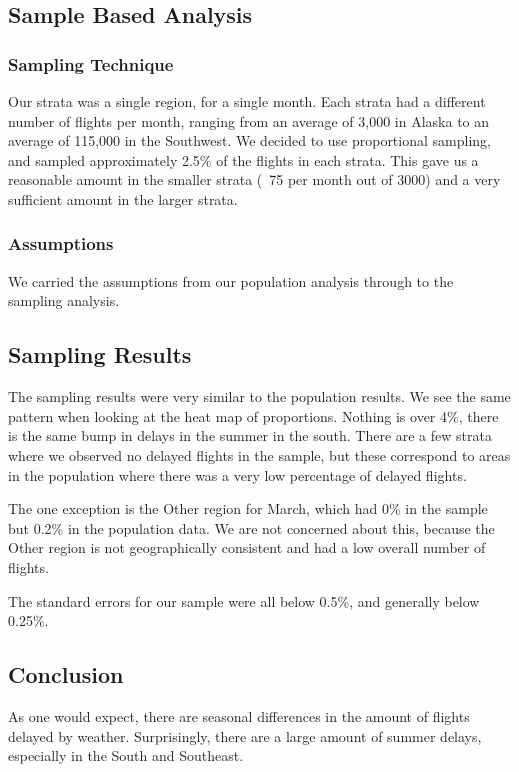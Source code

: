 \documentclass{article}
\begin{document}
\subsection{Sample Based Analysis}
\subsubsection{Sampling Technique}
Our strata was a single region, for a single month. Each strata had a different number of flights per month, ranging from an average of 3,000 in Alaska to an average of 115,000 in the Southwest. We decided to use proportional sampling, and sampled approximately 2.5\% of the flights in each strata. This gave us a reasonable amount in the smaller strata (~75 per month out of 3000) and a very sufficient amount in the larger strata. 

\subsubsection{Assumptions}
We carried the assumptions from our population analysis through to the sampling analysis.

\subsection{Sampling Results}
The sampling results were very similar to the population results. We see the same pattern when looking at the heat map of proportions. Nothing is over 4\%, there is the same bump in delays in the summer in the south. There are a few strata where we observed no delayed flights in the sample, but these correspond to areas in the population where there was a very low percentage of delayed flights.

The one exception is the Other region for March, which had 0\% in the sample but 0.2\% in the population data. We are not concerned about this, because the Other region is not geographically consistent and had a low overall number of flights.

The standard errors for our sample were all below 0.5\%, and generally below 0.25\%.

\subsection{Conclusion}
As one would expect, there are seasonal differences in the amount of flights delayed by weather. Surprisingly, there are a large amount of summer delays, especially in the South and Southeast. 
\end{document}
